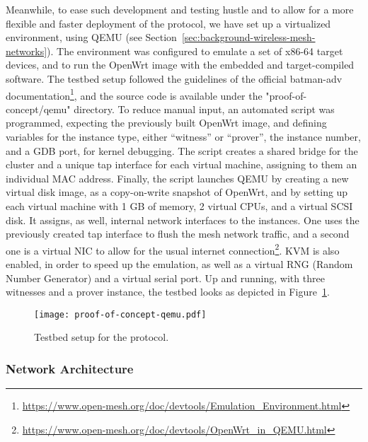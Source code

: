 Meanwhile, to ease such development and testing hustle and to allow for a more flexible and faster deployment of the protocol, we have set up a virtualized environment, using QEMU (see Section~\ref{sec:background-wireless-mesh-networks}). The environment was configured to emulate a set of x86-64 target devices, and to run the OpenWrt image with the embedded and target-compiled \pol{} software. The testbed setup followed the guidelines of the official batman-adv documentation\footnote{\url{https://www.open-mesh.org/doc/devtools/Emulation_Environment.html}}, and the source code is available under the "proof-of-concept/qemu" directory. To reduce manual input, an automated script was programmed, expecting the previously built OpenWrt image, and defining variables for the instance type, either “witness” or “prover”, the instance number, and a GDB port, for kernel debugging. The script creates a shared bridge for the cluster and a unique tap interface for each virtual machine, assigning to them an individual MAC address. Finally, the script launches QEMU by creating a new virtual disk image, as a copy-on-write snapshot of OpenWrt, and by setting up each virtual machine with 1 GB of memory, 2 virtual CPUs, and a virtual SCSI disk. It assigns, as well, internal network interfaces to the instances. One uses the previously created tap interface to flush the mesh network traffic, and a second one is a virtual NIC to allow for the usual internet connection\footnote{\url{https://www.open-mesh.org/doc/devtools/OpenWrt_in_QEMU.html}}. KVM is also enabled, in order to speed up the emulation, as well as a virtual RNG (Random Number Generator) and a virtual serial port. Up and running, with three witnesses and a prover instance, the testbed looks as depicted in Figure~\ref{fig:infrastructure:testbed}.

\begin{figure}[h!]
    \begin{center}
    \texttt{[image: proof-of-concept-qemu.pdf]}
    \caption{Testbed setup for the \pol{} protocol.}
    \label{fig:infrastructure:testbed}
    \end{center}
\end{figure}

\subsubsection{Network Architecture} \label{sec:infrastructure:network-architecture}

